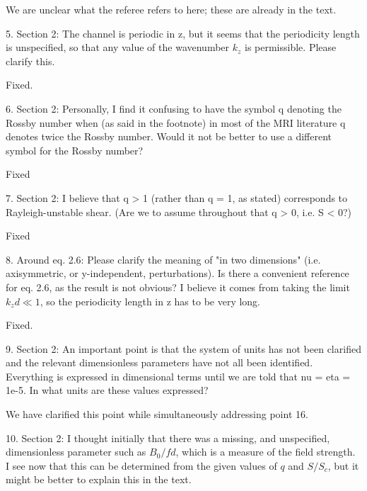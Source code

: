 \documentclass[letterpaper, 12pt]{article}
\newenvironment{review}{\vspace{1em}\begin{leftbar}}{\end{leftbar}}
\begin{document}
We are unclear what the referee refers to here; these are already in the text.

\begin{review}
5. Section 2: The channel is periodic in z, but it seems that the periodicity length is unspecified, so that any value of the wavenumber $k_z$ is permissible. Please clarify this.
\end{review}
  
Fixed.

\begin{review}
6. Section 2: Personally, I find it confusing to have the symbol q denoting the Rossby number when (as said in the footnote) in most of the MRI literature q denotes twice the Rossby number. Would it not be better to use a different symbol for the Rossby number?
\end{review}

Fixed

\begin{review}
7. Section 2: I believe that q > 1 (rather than q = 1, as stated) corresponds to Rayleigh-unstable shear. (Are we to assume throughout that q > 0, i.e. S < 0?)
\end{review}
Fixed

\begin{review}
8. Around eq. 2.6: Please clarify the meaning of "in two dimensions" (i.e. axisymmetric, or y-independent, perturbations). Is there a convenient reference for eq. 2.6, as the result is not obvious? I believe it comes from taking the limit $k_z d \ll 1$, so the periodicity length in z has to be very long.
\end{review}

Fixed.


\begin{review}
9. Section 2: An important point is that the system of units has not been clarified and the relevant dimensionless parameters have not all been identified. Everything is expressed in dimensional terms until we are told that nu = eta = 1e-5. In what units are these values expressed?
  \end{review}

We have clarified this point while simultaneously addressing point 16.

\begin{review}
10. Section 2: I thought initially that there was a missing, and unspecified, dimensionless parameter such as $B_0 / f d$, which is a measure of the field strength. I see now that this can be determined from the given values of $q$ and $S/S_c$, but it might be better to explain this in the text.
\end{review}
\end{document}
